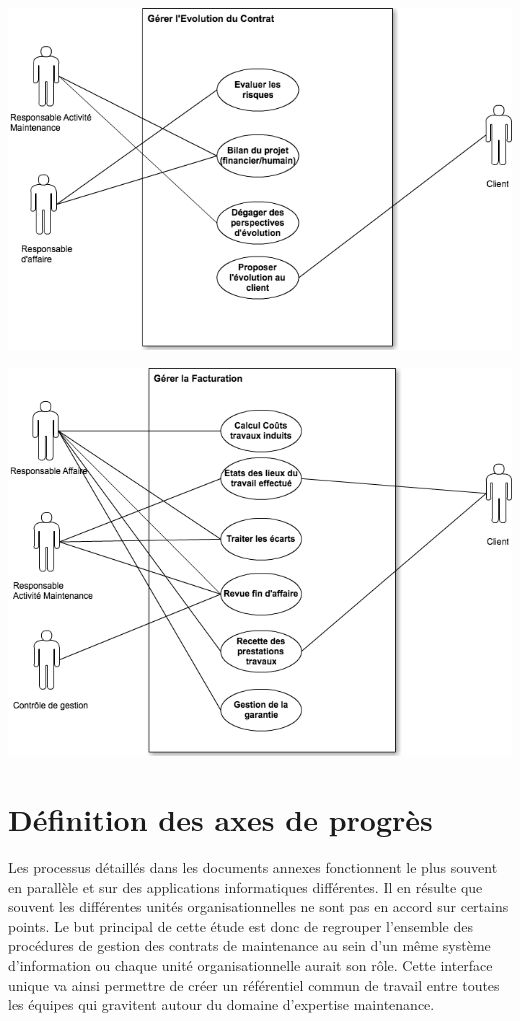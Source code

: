 \begin {center}
\includegraphics[width=\textwidth]{png/DCUGererEvolutionContrat.png}
\end {center}

\begin {center}
\includegraphics[width=\textwidth]{png/DCUGererFacturation.png}
\end {center}


\section{Définition des axes de progrès}

Les processus détaillés dans les documents annexes fonctionnent le plus souvent en parallèle et sur des applications informatiques différentes. Il en résulte que souvent les différentes unités organisationnelles ne sont pas en accord sur certains points. Le but principal de cette étude est donc de regrouper l'ensemble des procédures de gestion des contrats de maintenance au sein d'un même système d'information ou chaque unité organisationnelle aurait son rôle. Cette interface unique va ainsi permettre de créer un référentiel commun de travail entre toutes les équipes qui gravitent autour du domaine d'expertise maintenance.

